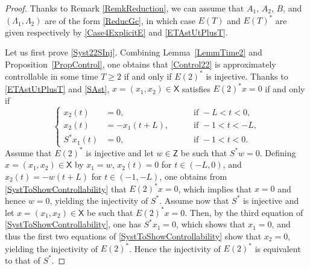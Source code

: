 \documentclass[10pt]{article}
\theoremstyle{plain}
\theoremstyle{definition}
\numberwithin{equation}{section}\numberwithin{figure}{section}\emergencystretch=3em
\begin{document}
\begin{proof}
Thanks to Remark \ref{RemkReduction}, we can assume that $A_1$, $A_2$, $B$, and $(\Lambda_1, \Lambda_2)$ are of the form \eqref{ReducGc}, in which case $E(T)$ and $E(T)^\ast$ are given respectively by \eqref{Case4ExplicitE} and \eqref{ETAstUtPlusT}.

Let us first prove \eqref{Syst22SInj}. Combining Lemma~\ref{LemmTime2} and Proposition~\ref{PropControl}, one obtains that \eqref{Control22} is approximately controllable in some time $T \geq 2$ if and only if $E(2)^\ast$ is injective. Thanks to \eqref{ETAstUtPlusT} and \eqref{SAst}, $x = (x_1, x_2) \in \mathsf X$ satisfies $E(2)^\ast x = 0$ if and only if
\begin{equation}
\label{SystToShowControllability}
\left\{
\begin{aligned}
x_2(t) & = 0, & \quad & \text{ if } -L < t < 0, \\
x_2(t) & = -x_1(t + L) , & & \text{ if } -1 < t < -L, \\
S^\ast x_1(t) & = 0, & & \text{ if } -1 < t < 0.
\end{aligned}
\right.
\end{equation}
Assume that $E(2)^\ast$ is injective and let $w \in \mathsf Z$ be such that $S^\ast w = 0$. Defining $x = (x_1, x_2) \in \mathsf X$ by $x_1 = w$, $x_2(t) = 0$ for $t \in (-L, 0)$, and $x_2(t) = -w(t + L)$ for $t \in (-1, -L)$, one obtains from \eqref{SystToShowControllability} that $E(2)^\ast x = 0$, which implies that $x = 0$ and hence $w = 0$, yielding the injectivity of $S^\ast$. Assume now that $S^\ast$ is injective and let $x = (x_1, x_2) \in \mathsf X$ be such that $E(2)^\ast x = 0$. Then, by the third equation of \eqref{SystToShowControllability}, one has $S^\ast x_1 = 0$, which shows that $x_1 = 0$, and thus the first two equations of \eqref{SystToShowControllability} show that $x_2 = 0$, yielding the injectivity of $E(2)^\ast$. Hence the injectivity of $E(2)^\ast$ is equivalent to that of $S^\ast$.


\end{proof}
\end{document}
